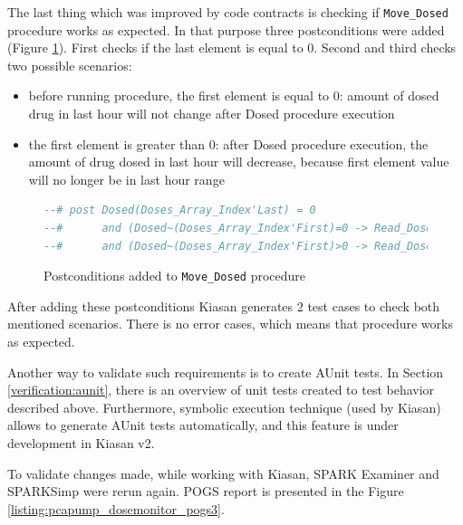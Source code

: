 The last thing which was improved by code contracts is checking if \lstinline{Move_Dosed} procedure works as expected. In that purpose three postconditions were added (Figure \ref{listing:postconditions_added_to_move_dosed}). First checks if the last element is equal to 0. Second and third checks two possible scenarios: 
\begin{itemize}
    \item before running procedure, the first element is equal to 0: amount of dosed drug in last hour will not change after Dosed procedure execution
    \item the first element is greater than 0: after Dosed procedure execution, the amount of drug dosed in last hour will decrease, because first element value will no longer be in last hour range
\end{itemize}

\begin{figure}
\singlespacing
\begin{lstlisting}[language=ada, frame=single, gobble=0]
--# post Dosed(Doses_Array_Index'Last) = 0 
--#      and (Dosed~(Doses_Array_Index'First)=0 -> Read_Dosed(Dosed~) = Read_Dosed(Dosed))
--#      and (Dosed~(Doses_Array_Index'First)>0 -> Read_Dosed(Dosed~) > Read_Dosed(Dosed));
\end{lstlisting}
\doublespacing
\caption{Postconditions added to \lstinline{Move_Dosed} procedure}
\label{listing:postconditions_added_to_move_dosed}
\end{figure}

After adding these postconditions Kiasan generates 2 test cases to check both mentioned scenarios. There is no error cases, which means that procedure works as expected. 

Another way to validate such requirements is to create AUnit tests. In Section \ref{verification:aunit}, there is an overview of unit tests created to test behavior described above. Furthermore, symbolic execution technique (used by Kiasan) allows to generate AUnit tests automatically, and this feature is under development in Kiasan v2.

To validate changes made, while working with Kiasan, SPARK Examiner and SPARKSimp were rerun again. POGS report is presented in the Figure \ref{listing:pcapump_dosemonitor_pogs3}.

